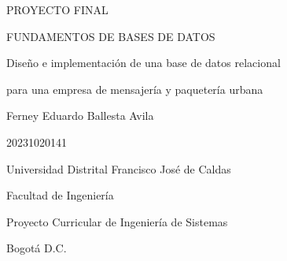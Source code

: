 \documentclass[12pt,letterpaper]{article}
\DeclareRobustCommand{\_}{\textunderscore\allowbreak}
\begin{document}
\begin{titlepage}
\centering
\vspace*{3cm}

PROYECTO FINAL\par
FUNDAMENTOS DE BASES DE DATOS

\vspace{3cm}

Diseño e implementación de una base de datos relacional\par
para una empresa de mensajería y paquetería urbana

\vspace{4cm}

Ferney Eduardo Ballesta Avila\par
20231020141

\vfill

Universidad Distrital Francisco José de Caldas\par
Facultad de Ingeniería\par
Proyecto Curricular de Ingeniería de Sistemas\par
Bogotá D.C.\par
\the\year
\end{titlepage}

\tableofcontents
\newpage
\listoffigures
\newpage
\listoftables
\newpage


\newpage


\newpage


\newpage


\newpage


\newpage


\newpage

\appendix
{}


\newpage


\newpage


\newpage


\newpage


\end{document}
